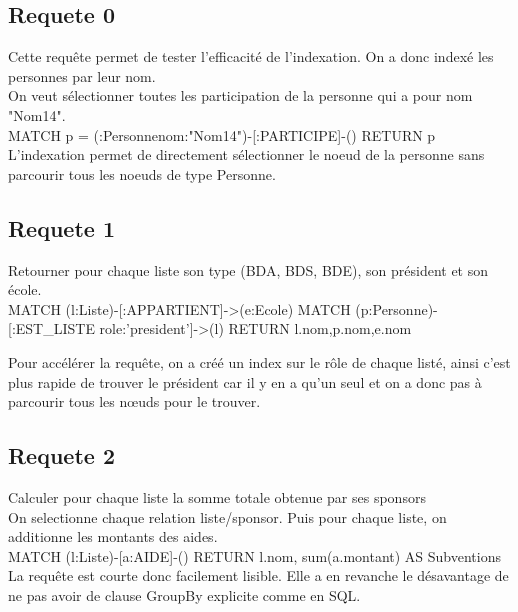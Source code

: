 \documentclass[a4paper,oneside,1pt]{article}
\begin{document}

\subsection{Requete 0}
Cette requête permet de tester l'efficacité de l'indexation. On a donc indexé les personnes par leur nom.
\\
On veut sélectionner toutes les participation de la personne qui a pour nom "Nom14". 
\\
MATCH p = (:Personne{nom:"Nom14"})-[:PARTICIPE]-() RETURN p
\\L'indexation permet de directement sélectionner le noeud de la personne sans parcourir tous les noeuds de type Personne.

\subsection{Requete 1}
Retourner pour chaque liste son type (BDA, BDS, BDE), son président et son école.
\\
MATCH (l:Liste)-[:APPARTIENT]->(e:Ecole)
MATCH (p:Personne)-[:EST\_LISTE {role:'president'}]->(l)
RETURN l.nom,p.nom,e.nom

Pour accélérer la requête, on a créé un index sur le rôle de chaque listé, ainsi c'est plus rapide de trouver le président car il y en a qu'un seul et on a donc pas à parcourir tous les nœuds pour le trouver.


\subsection{Requete 2}
Calculer pour chaque liste la somme totale obtenue par ses sponsors
\\
On selectionne chaque relation liste/sponsor. Puis pour chaque liste, on additionne les montants des aides.
\\
MATCH (l:Liste)-[a:AIDE]-() 
RETURN l.nom, sum(a.montant) AS Subventions
\\
La requête est courte donc facilement lisible. Elle a en revanche le désavantage de ne pas avoir de clause GroupBy explicite comme en SQL.
\end{document}
